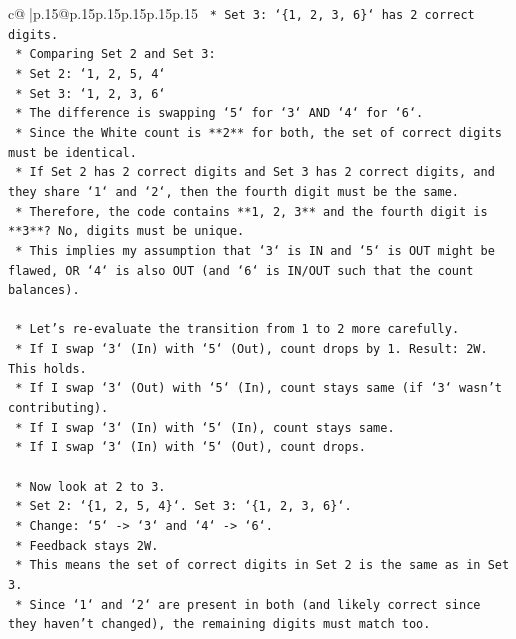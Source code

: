 \documentclass{article}
\begin{document}
{\begin{supertabular}{c@{$\;$}|p{.15\linewidth}@{}p{.15\linewidth}p{.15\linewidth}p{.15\linewidth}p{.15\linewidth}p{.15\linewidth}}
{{{\texttt{    *   Set 3: `\{1, 2, 3, 6\}` has 2 correct digits.} \\
\texttt{    *   Comparing Set 2 and Set 3:} \\
\texttt{        *   Set 2: `1, 2, 5, 4`} \\
\texttt{        *   Set 3: `1, 2, 3, 6`} \\
\texttt{        *   The difference is swapping `5` for `3` AND `4` for `6`.} \\
\texttt{        *   Since the White count is **2** for both, the set of correct digits must be identical.} \\
\texttt{        *   If Set 2 has 2 correct digits and Set 3 has 2 correct digits, and they share `1` and `2`, then the fourth digit must be the same.} \\
\texttt{        *   Therefore, the code contains **1, 2, 3** and the fourth digit is **3**? No, digits must be unique.} \\
\texttt{        *   This implies my assumption that `3` is IN and `5` is OUT might be flawed, OR `4` is also OUT (and `6` is IN/OUT such that the count balances).} \\
\\ 
\texttt{    *   Let's re{-}evaluate the transition from 1 to 2 more carefully.} \\
\texttt{        *   If I swap `3` (In) with `5` (Out), count drops by 1. Result: 2W. This holds.} \\
\texttt{        *   If I swap `3` (Out) with `5` (In), count stays same (if `3` wasn't contributing).} \\
\texttt{        *   If I swap `3` (In) with `5` (In), count stays same.} \\
\texttt{        *   If I swap `3` (In) with `5` (Out), count drops.} \\
\\ 
\texttt{    *   Now look at 2 to 3.} \\
\texttt{        *   Set 2: `\{1, 2, 5, 4\}`. Set 3: `\{1, 2, 3, 6\}`.} \\
\texttt{        *   Change: `5` {-}> `3` and `4` {-}> `6`.} \\
\texttt{        *   Feedback stays 2W.} \\
\texttt{        *   This means the set of correct digits in Set 2 is the same as in Set 3.} \\
\texttt{        *   Since `1` and `2` are present in both (and likely correct since they haven't changed), the remaining digits must match too.} \\
}}}
\end{supertabular}}
\end{document}
